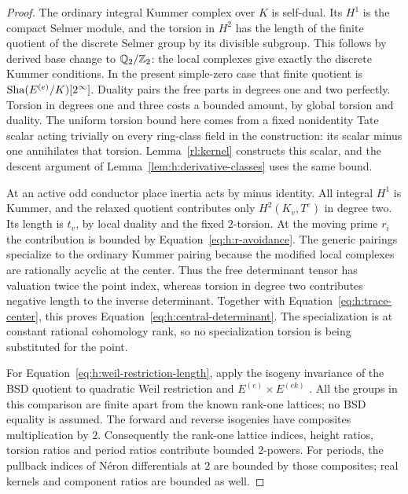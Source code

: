 \begin{proof}
The ordinary integral Kummer complex over $K$ is self-dual. Its $H^1$ is
the compact Selmer module, and the torsion in $H^2$ has the length of the
finite quotient of the discrete Selmer group by its divisible subgroup.
This follows by derived base change to $\mathbb Q_2/\mathbb Z_2$: the local
complexes give exactly the discrete Kummer conditions. In the present
simple-zero case that finite quotient is
$\operatorname{Sha}(E^{(e)}/K)[2^\infty]$. Duality pairs the free parts in degrees
one and two perfectly. Torsion in degrees one and three costs a bounded
amount, by global torsion and duality. The uniform torsion bound here comes
from a fixed nonidentity Tate scalar acting trivially on every ring-class
field in the construction: its scalar minus one annihilates that torsion.
Lemma~\ref{rl:kernel} constructs this scalar, and the descent argument
of Lemma~\ref{lem:h:derivative-classes} uses the same bound.

At an active odd conductor place inertia acts by minus identity.
All integral $H^1$ is Kummer, and the relaxed quotient contributes only
$H^2(K_v,T^e)$ in degree two. Its length is $t_v$, by local duality
and the fixed $2$-torsion. At the moving prime $r_i$ the contribution
is bounded by
Equation~\eqref{eq:h:r-avoidance}. The generic pairings specialize to
the ordinary Kummer pairing because the modified local complexes are
rationally acyclic at the center. Thus the free determinant tensor has
valuation twice the point index, whereas torsion in degree two
contributes negative length to the inverse determinant. Together with
Equation~\eqref{eq:h:trace-center}, this proves
Equation~\eqref{eq:h:central-determinant}. The specialization is at
constant rational cohomology rank, so no specialization torsion is
being substituted for the point.

For Equation~\eqref{eq:h:weil-restriction-length}, apply the isogeny
invariance of the BSD quotient to quadratic Weil restriction and
$E^{(e)}\times E^{(ek)}$
\citep[Theorem~2.1 and the preceding discussion]{Tate1966}.
All the groups in this
comparison are finite apart from the known rank-one lattices; no BSD
equality is assumed. The forward and reverse isogenies have composites
multiplication by $2$. Consequently the rank-one lattice indices,
height ratios, torsion ratios and period ratios contribute bounded
$2$-powers. For periods, the pullback indices of N\'eron differentials
at $2$ are bounded by those composites; real kernels and component
ratios are bounded as well.


\end{proof}

